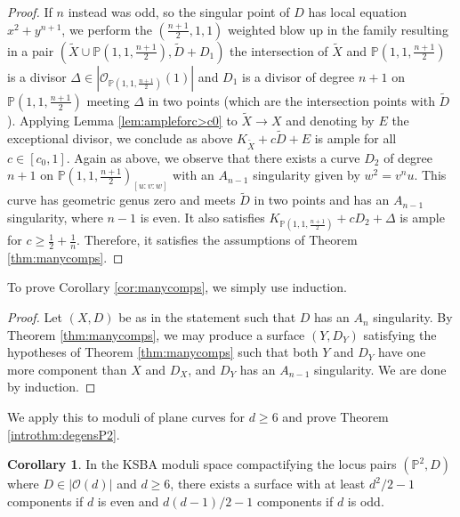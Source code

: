 \documentclass[11pt]{amsart}
\numberwithin{equation}{section}
\theoremstyle{definition}
\newtheorem{corollary}[theorem]{Corollary}
\newcommand{\bP}{\mathbb{P}}
\newcommand{\calO}{\mathcal{O}}
\begin{document}
\begin{proof}
If $n$ instead was odd, so the singular point of $D$ has local equation $x^2 + y^{n+1}$, we perform the $(\frac{n+1}{2}, 1, 1)$ weighted blow up in the family resulting in a pair $(\tilde{X}\cup \bP(1,1,\frac{n+1}{2}), \tilde{D} + D_1)$ the intersection of $\tilde{X}$ and $\bP(1,1,\frac{n+1}{2})$ is a divisor $\Delta \in |\calO_{\bP(1,1,\frac{n+1}{2})}(1)|$ and $D_1$ is a divisor of degree $n+1$ on $\bP(1,1, \frac{n+1}{2})$ meeting $\Delta$ in two points (which are the intersection points with $\tilde{D}$).  Applying Lemma \ref{lem:ampleforc>c0} to $\tilde{X} \to X$ and denoting by $E$ the exceptional divisor, we conclude as above $K_{\tilde{X}} + c\tilde{D} + E$ is ample for all $c \in [c_0,1]$. Again as above, we observe that there exists a curve $D_2$ of degree $n+1$ on $\bP(1,1,\frac{n+1}{2})_{[u:v:w]}$ with an $A_{n-1}$ singularity given by $w^2 = v^nu$.  This curve has geometric genus zero and meets $\tilde{D}$ in two points and has an $A_{n-1}$ singularity, where $n-1$ is even.  It also satisfies $K_{\bP(1,1,\frac{n+1}{2})} + cD_2 + \Delta$ is ample for $c \ge \frac{1}{2}+ \frac{1}{n}$. Therefore, it satisfies the assumptions of Theorem \ref{thm:manycomps}.  
\end{proof}

To prove Corollary \ref{cor:manycomps}, we simply use induction.

\begin{proof}
    Let $(X,D)$ be as in the statement such that $D$ has an $A_n$ singularity.  By Theorem \ref{thm:manycomps}, we may produce a surface $(Y,D_Y)$ satisfying the hypotheses of Theorem \ref{thm:manycomps} such that both $Y$ and $D_Y$ have one more component than $X$ and $D_X$, and $D_Y$ has an $A_{n-1}$ singularity.  We are done by induction.
\end{proof}


We apply this to moduli of plane curves for $d \ge 6$ and prove Theorem \ref{introthm:degensP2}. 


\begin{corollary}
    In the KSBA moduli space compactifying the locus pairs $(\bP^2, D)$ where $D \in |\calO(d)|$ and $d \ge 6$, there exists a surface with at least $d^2/2 - 1$ components if $d$ is even and $d(d-1)/2  - 1$ components if $d$ is odd.  
\end{corollary}
\end{document}

